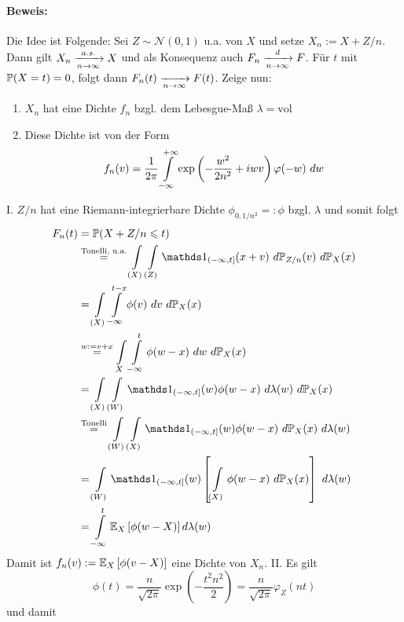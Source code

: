 \paragraph{Beweis:} Die Idee ist Folgende: \newline
Sei $Z\sim\mathcal{N}(0,1)$ u.a. von $X$ und setze $X_n:=X+Z/n$. Dann gilt $X_n\nto{a.s.}{n\to\infty}X$ und als Konsequenz auch $F_n\nto{d}{n\to\infty}F$. F\"ur $t$ mit $\mathbb{P}(X=t)=0$, folgt dann $F_n(t)\nto{}{n\to\infty}F(t)$. Zeige nun: 
\begin{enumerate}[label=\Roman*.]
    \item $X_n$ hat eine Dichte $f_n$ bzgl. dem Lebesgue-Ma\ss{} $\lambda=\text{vol}$
    \item Diese Dichte ist von der Form 
    $$f_n(v)=\dfrac{1}{2\pi}\int\displaylimits_{-\infty}^{+\infty}\exp\left(-\dfrac{w^2}{2n^2}+iwv\right)\varphi(-w)\ dw$$
\end{enumerate}
\vspace{1ex}
I. $Z/n$ hat eine Riemann-integrierbare Dichte $\phi_{0,1/n^2}=:\phi$ bzgl. $\lambda$ und somit folgt
\begin{align*}
    F_n(t)&=\Pp(X+Z/n\leq t)\\
    &\overset{\text{Tonelli, u.a.}}{=}\int\displaylimits_{(X)}\int\displaylimits_{(Z)}\ind{(-\infty,t]}(x+v)\ d\Pp_{Z/n}(v)\ d\Pp_X(x) \\
    &=\int\displaylimits_{(X)}\int\displaylimits_{-\infty}^{t-x}\phi(v)\ dv\ d\Pp_X(x) \\
    &\overset{w:=v+x}{=}\int\displaylimits_{X}\int\displaylimits_{-\infty}^t \phi(w-x)\ dw\ d\Pp_X(x) \\
    &=\int\displaylimits_{(X)}\int\displaylimits_{(W)}\ind{(-\infty,t]}(w)\phi(w-x)\ d\lambda(w)\ d\Pp_X(x) \\
    &\overset{\text{Tonelli}}{=}\int\displaylimits_{(W)}\int\displaylimits_{(X)}\ind{(-\infty,t]}(w)\phi(w-x)\ d\Pp_X(x)\ d\lambda(w) \\
    &=\int\displaylimits_{(W)}\ind{(-\infty,t]}(w)\left[\int\displaylimits_{(X)}\phi(w-x)\ d\Pp_X(x)\right]\ d\lambda(w) \\
    &=\int\displaylimits_{-\infty}^t \E_X\left[\phi(w-X)\right]d\lambda(w)
\end{align*}
Damit ist $f_n(v):=\mathbb{E}_X\left[\phi(v-X)\right]$ eine Dichte von $X_n$.\newline\newline
II. Es gilt 
$$\phi(t)=\dfrac{n}{\sqrt{2\pi}}\exp\left(-\dfrac{t^2n^2}{2}\right)=\dfrac{n}{\sqrt{2\pi}}\varphi_Z(nt)$$
und damit 
